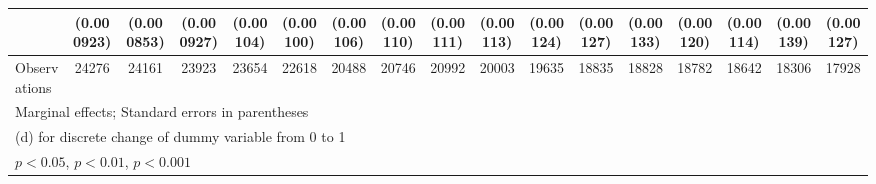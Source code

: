 {\begin{tabular}{l*{16}{c}}
                    &  (0.000923)         &  (0.000853)         &  (0.000927)         &   (0.00104)         &   (0.00100)         &   (0.00106)         &   (0.00110)         &   (0.00111)         &   (0.00113)         &   (0.00124)         &   (0.00127)         &   (0.00133)         &   (0.00120)         &   (0.00114)         &   (0.00139)         &   (0.00127)         \\
\hline
Observations        &       24276         &       24161         &       23923         &       23654         &       22618         &       20488         &       20746         &       20992         &       20003         &       19635         &       18835         &       18828         &       18782         &       18642         &       18306         &       17928         \\
\hline\hline
\multicolumn{17}{l}{\footnotesize Marginal effects; Standard errors in parentheses}\\
\multicolumn{17}{l}{\footnotesize  (d) for discrete change of dummy variable from 0 to 1}\\
\multicolumn{17}{l}{\footnotesize \sym{*} \(p<0.05\), \sym{**} \(p<0.01\), \sym{***} \(p<0.001\)}\\
\end{tabular}
}
